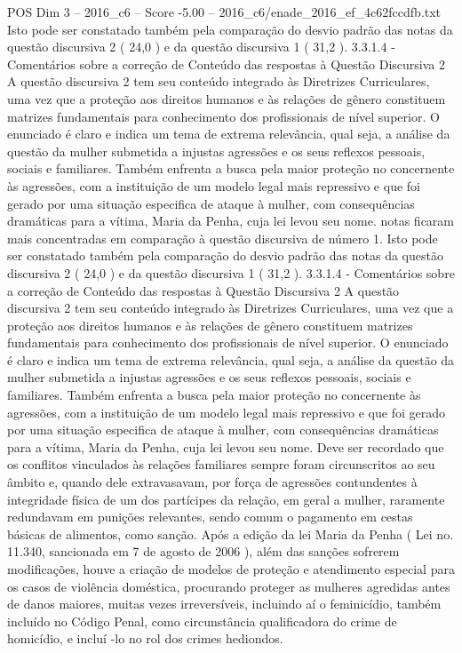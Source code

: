 \begin{textsample}{POS Dim 3 – 2016\_c6 – Score -5.00 – 2016\_c6/enade\_2016\_ef\_4c62fccdfb.txt}
Isto pode ser constatado também pela comparação do desvio padrão das notas da questão discursiva 2 ( 24,0 ) e da questão discursiva 1 ( 31,2 ). 3.3.1.4 - Comentários sobre a correção de Conteúdo das respostas à Questão Discursiva 2 A questão discursiva 2 tem seu conteúdo integrado às Diretrizes Curriculares, uma vez que a proteção aos direitos humanos e às relações de gênero constituem matrizes fundamentais para conhecimento dos profissionais de nível superior.
O enunciado é claro e indica um tema de extrema relevância, qual seja, a análise da questão da mulher submetida a injustas agressões e os seus reflexos pessoais, sociais e familiares.
Também enfrenta a busca pela maior proteção no concernente às agressões, com a instituição de um modelo legal mais repressivo e que foi gerado por uma situação especifica de ataque à mulher, com consequências dramáticas para a vítima, Maria da Penha, cuja lei levou seu nome. notas ficaram mais concentradas em comparação à questão discursiva de número 1.
Isto pode ser constatado também pela comparação do desvio padrão das notas da questão discursiva 2 ( 24,0 ) e da questão discursiva 1 ( 31,2 ). 3.3.1.4 - Comentários sobre a correção de Conteúdo das respostas à Questão Discursiva 2 A questão discursiva 2 tem seu conteúdo integrado às Diretrizes Curriculares, uma vez que a proteção aos direitos humanos e às relações de gênero constituem matrizes fundamentais para conhecimento dos profissionais de nível superior.
O enunciado é claro e indica um tema de extrema relevância, qual seja, a análise da questão da mulher submetida a injustas agressões e os seus reflexos pessoais, sociais e familiares.
Também enfrenta a busca pela maior proteção no concernente às agressões, com a instituição de um modelo legal mais repressivo e que foi gerado por uma situação especifica de ataque à mulher, com consequências dramáticas para a vítima, Maria da Penha, cuja lei levou seu nome.
Deve ser recordado que os conflitos vinculados às relações familiares sempre foram circunscritos ao seu âmbito e, quando dele extravasavam, por força de agressões contundentes à integridade física de um dos partícipes da relação, em geral a mulher, raramente redundavam em punições relevantes, sendo comum o pagamento em cestas básicas de alimentos, como sanção.
Após a edição da lei Maria da Penha ( Lei no. 11.340, sancionada em 7 de agosto de 2006 ), além das sanções sofrerem modificações, houve a criação de modelos de proteção e atendimento especial para os casos de violência doméstica, procurando proteger as mulheres agredidas antes de danos maiores, muitas vezes irreversíveis, incluindo aí o feminicídio, também incluído no Código Penal, como circunstância qualificadora do crime de homicídio, e incluí -lo no rol dos crimes hediondos.

\end{textsample}
